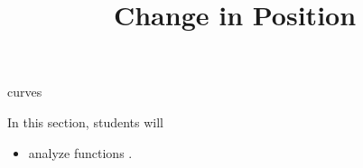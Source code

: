 \documentclass{ximera}
\title{Change in Position}
\begin{document}
\begin{abstract}
%
\end{abstract}
\maketitle


curves


\begin{sectionOutcomes}
In this section, students will 

\begin{itemize}
\item analyze functions .
\end{itemize}
\end{sectionOutcomes}
\end{document}
